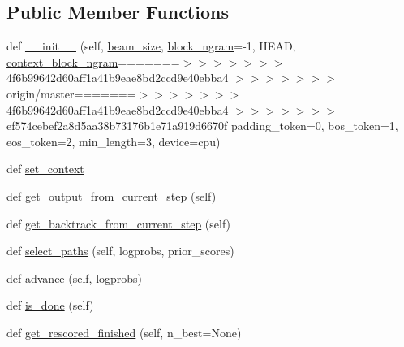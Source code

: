 \subsection*{Public Member Functions}
\begin{DoxyCompactItemize}
\item 
def \hyperlink{classparlai_1_1core_1_1torch__generator__agent_1_1TreeSearch_ac1496d6205b8156573f0e79f4ff5fa43}{\+\_\+\+\_\+init\+\_\+\+\_\+} (self, \hyperlink{classparlai_1_1core_1_1torch__generator__agent_1_1TreeSearch_a2381c33e5233a5f5c1e50c65ab0ee572}{beam\+\_\+size}, \hyperlink{classparlai_1_1core_1_1torch__generator__agent_1_1TreeSearch_a6b27ba18a5e343345ab7319f2ead843d}{block\+\_\+ngram}=-\/1, H\+E\+AD, \hyperlink{classparlai_1_1core_1_1torch__generator__agent_1_1TreeSearch_ab1411b1cb22d74f4682213c487d23898}{context\+\_\+block\+\_\+ngram}=======$>$$>$$>$$>$$>$$>$$>$ 4f6b99642d60aff1a41b9eae8bd2ccd9e40ebba4 $>$$>$$>$$>$$>$$>$$>$ origin/master=======$>$$>$$>$$>$$>$$>$$>$ 4f6b99642d60aff1a41b9eae8bd2ccd9e40ebba4 $>$$>$$>$$>$$>$$>$$>$ ef574cebef2a8d5aa38b73176b1e71a919d6670f padding\+\_\+token=0, bos\+\_\+token=1, eos\+\_\+token=2, min\+\_\+length=3, device=\textquotesingle{}cpu\textquotesingle{})
\item 
def \hyperlink{classparlai_1_1core_1_1torch__generator__agent_1_1TreeSearch_a4706cbec7117a8a2696774c044fc0729}{set\+\_\+context}
\item 
def \hyperlink{classparlai_1_1core_1_1torch__generator__agent_1_1TreeSearch_a929ecbf60f149968caae5a0a6908d67a}{get\+\_\+output\+\_\+from\+\_\+current\+\_\+step} (self)
\item 
def \hyperlink{classparlai_1_1core_1_1torch__generator__agent_1_1TreeSearch_aced42f37b580f876286b5075ba188b2a}{get\+\_\+backtrack\+\_\+from\+\_\+current\+\_\+step} (self)
\item 
def \hyperlink{classparlai_1_1core_1_1torch__generator__agent_1_1TreeSearch_a004609539d0428a9351a991168eb370b}{select\+\_\+paths} (self, logprobs, prior\+\_\+scores)
\item 
def \hyperlink{classparlai_1_1core_1_1torch__generator__agent_1_1TreeSearch_a9f371e57095af5b22ff5eae4c57326c8}{advance} (self, logprobs)
\item 
def \hyperlink{classparlai_1_1core_1_1torch__generator__agent_1_1TreeSearch_a35a3cbfe2df2d02bb46f7e492657afa5}{is\+\_\+done} (self)
\item 
def \hyperlink{classparlai_1_1core_1_1torch__generator__agent_1_1TreeSearch_a4b70f85eec7d81b3a0e1afaea5b09332}{get\+\_\+rescored\+\_\+finished} (self, n\+\_\+best=None)
\end{DoxyCompactItemize}
